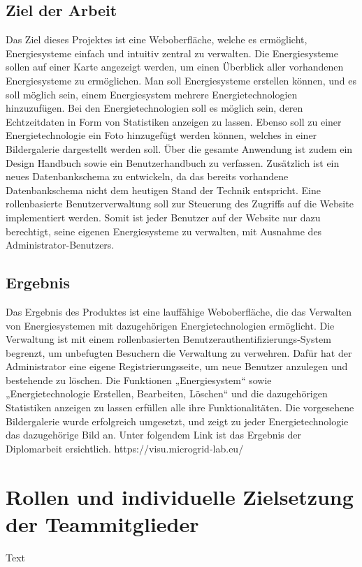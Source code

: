 \subsection{Ziel der Arbeit}
Das Ziel dieses Projektes ist eine Weboberfläche, welche es ermöglicht, Energiesysteme einfach und intuitiv zentral zu verwalten. Die Energiesysteme sollen auf einer Karte angezeigt werden, um einen Überblick aller vorhandenen Energiesysteme zu ermöglichen. Man soll Energiesysteme erstellen können, und es soll möglich sein, einem Energiesystem mehrere Energietechnologien hinzuzufügen. Bei den Energietechnologien soll es möglich sein, deren Echtzeitdaten in Form von Statistiken anzeigen zu lassen. Ebenso soll zu einer Energietechnologie ein Foto hinzugefügt werden können, welches in einer Bildergalerie dargestellt werden soll.
Über die gesamte Anwendung ist zudem ein Design Handbuch sowie ein Benutzerhandbuch zu verfassen. Zusätzlich ist ein neues Datenbankschema zu entwickeln, da das bereits vorhandene Datenbankschema nicht dem heutigen Stand der Technik entspricht. Eine rollenbasierte Benutzerverwaltung soll zur Steuerung des Zugriffs auf die Website implementiert werden. Somit ist jeder Benutzer auf der Website nur dazu berechtigt, seine eigenen Energiesysteme zu verwalten, mit Ausnahme des Administrator-Benutzers.



\subsection{Ergebnis}
Das Ergebnis des Produktes ist eine lauffähige Weboberfläche, die das Verwalten von Energiesystemen mit dazugehörigen Energietechnologien ermöglicht. Die Verwaltung ist mit einem rollenbasierten Benutzerauthentifizierungs-System begrenzt, um unbefugten Besuchern die Verwaltung zu verwehren. Dafür hat der Administrator eine eigene Registrierungsseite, um neue Benutzer anzulegen und bestehende zu löschen. Die Funktionen „Energiesystem“ sowie „Energietechnologie Erstellen, Bearbeiten, Löschen“ und die dazugehörigen Statistiken anzeigen zu lassen erfüllen alle ihre Funktionalitäten. Die vorgesehene Bildergalerie wurde erfolgreich umgesetzt, und zeigt zu jeder Energietechnologie das dazugehörige Bild an.
Unter folgendem Link ist das Ergebnis der Diplomarbeit ersichtlich.
https://visu.microgrid-lab.eu/

\newpage
\section{Rollen und individuelle Zielsetzung der Teammitglieder}
Text

